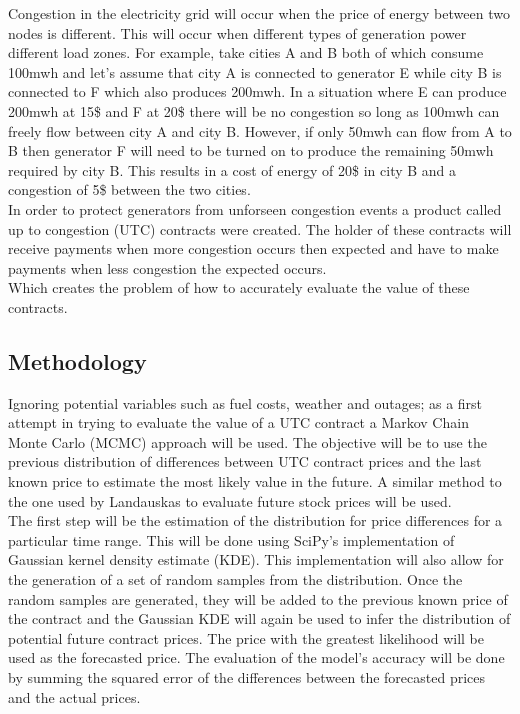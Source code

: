\documentclass{report}
\begin{document}
Congestion in the electricity grid will occur when the price of energy between
two nodes is different. This will occur when different types of generation power
different load zones. For example, take cities A and B both of which consume
100mwh and let's assume that city A is connected to generator E while city B is
connected to F which also produces 200mwh. In a situation where E can produce
200mwh at 15\$ and F at 20\$ there will be no congestion so long as 100mwh
can freely flow between city A and city B. However, if only 50mwh can flow
from A to B then generator F will need to be turned on to produce the remaining
50mwh required by city B. This results in a cost of energy
of 20\$ in city B and a congestion of 5\$ between the two cities.\\

In order to protect generators from unforseen congestion events a product called
up to congestion (UTC) contracts were created. The holder of these contracts will
receive payments when more congestion occurs then expected and have to make payments
when less congestion the expected occurs.\\

Which creates the problem of how to accurately evaluate the value of these contracts.\\

\subsection*{Methodology}
Ignoring potential variables such as fuel costs, weather and outages; as a first
attempt in trying to evaluate the value of a UTC contract a Markov
Chain Monte Carlo (MCMC) approach will be used. The objective will be to use the
previous distribution of differences between UTC contract prices and the last
known price to estimate the most likely value in the future. A similar method to
the one used by Landauskas \cite{landauskas} to evaluate future stock prices will
be used.\\

The first step will be the estimation of the distribution for price differences
for a particular time range. This will be done using SciPy's \cite{scipy}
implementation of Gaussian kernel density estimate (KDE). This implementation will
also allow for the generation of a set of random samples from the distribution.
Once the random samples are generated, they will be added to the previous known
price of the contract and the Gaussian KDE will again be used to infer the
distribution of potential future contract prices. The price with the greatest
likelihood will be used as the forecasted price. The evaluation of the model's accuracy will
be done by summing the squared error of the differences between the forecasted prices
and the actual prices.\\
\end{document}
